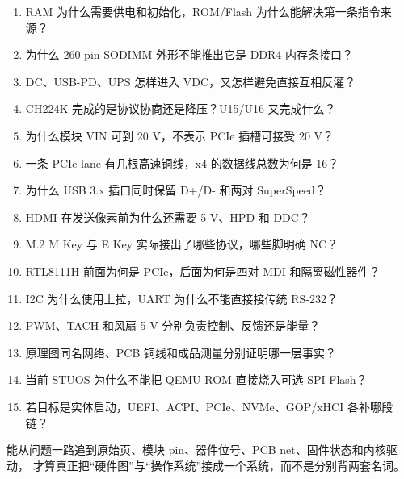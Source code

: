 \begin{enumerate}[leftmargin=2em]
  \item RAM 为什么需要供电和初始化，ROM/Flash 为什么能解决第一条指令来源？
  \item 为什么 260-pin SODIMM 外形不能推出它是 DDR4 内存条接口？
  \item DC、USB-PD、UPS 怎样进入 VDC，又怎样避免直接互相反灌？
  \item CH224K 完成的是协议协商还是降压？U15/U16 又完成什么？
  \item 为什么模块 VIN 可到 20 V，不表示 PCIe 插槽可接受 20 V？
  \item 一条 PCIe lane 有几根高速铜线，x4 的数据线总数为何是 16？
  \item 为什么 USB 3.x 插口同时保留 D+/D- 和两对 SuperSpeed？
  \item HDMI 在发送像素前为什么还需要 5 V、HPD 和 DDC？
  \item M.2 M Key 与 E Key 实际接出了哪些协议，哪些脚明确 NC？
  \item RTL8111H 前面为何是 PCIe，后面为何是四对 MDI 和隔离磁性器件？
  \item I2C 为什么使用上拉，UART 为什么不能直接接传统 RS-232？
  \item PWM、TACH 和风扇 5 V 分别负责控制、反馈还是能量？
  \item 原理图同名网络、PCB 铜线和成品测量分别证明哪一层事实？
  \item 当前 STUOS 为什么不能把 QEMU ROM 直接烧入可选 SPI Flash？
  \item 若目标是实体启动，UEFI、ACPI、PCIe、NVMe、GOP/xHCI 各补哪段链？
\end{enumerate}

能从问题一路追到原始页、模块 pin、器件位号、PCB net、固件状态和内核驱动，
才算真正把“硬件图”与“操作系统”接成一个系统，而不是分别背两套名词。
